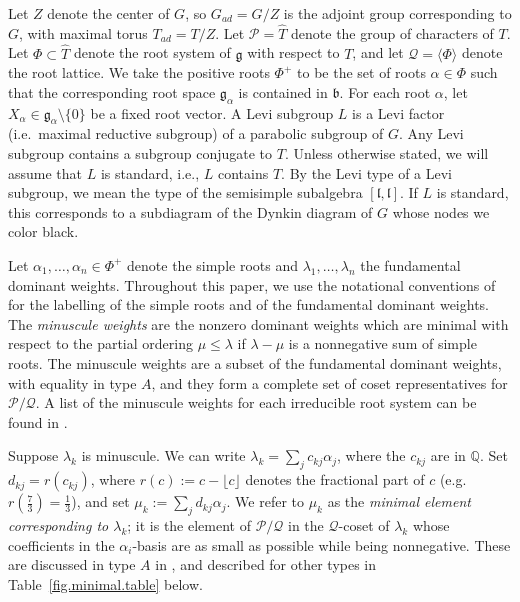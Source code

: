 \documentclass[reqno,11pt]{amsart}
\theoremstyle{remark}
\theoremstyle{remark}
\theoremstyle{definition}
\theoremstyle{definition}
\theoremstyle{definition}
\numberwithin{equation}{section}
\newcommand{\QQ}{\mathbb{ Q}}        %
\newcommand{\fb}{{\mathfrak b}}
\newcommand{\fg}{{\mathfrak g}}
\newcommand{\fl}{{\mathfrak l}}
\newcommand{\ga}{\alpha}
\newcommand{\gl}{\lambda}
\newcommand{\cp}{\mathcal{P}}
\newcommand{\cq}{\mathcal{Q}}
\renewcommand{\hat}{\widehat}
\begin{document}
Let $Z$ denote the center of $G$, so $G_{ad} = G/Z$ is the adjoint group corresponding to $G$, with maximal torus $T_{ad} = T/Z$.  Let $\cp = \hat{T}$ denote the group of characters of $T$.  Let $\Phi \subset \hat{T}$ denote the root system of $\fg$ with respect to $T$, and let $\cq = \langle \Phi \rangle$ denote the root lattice.   We take the positive roots $\Phi^+$ to be the set of roots $\ga\in \Phi$ such that the corresponding root space $\fg_{\ga}$ is contained in $\fb$.  For each root $\ga$, let $X_\ga \in \fg_\ga \setminus \{0\}$ be a fixed root vector.   A Levi subgroup $L$ is a Levi factor (i.e.~maximal reductive subgroup) of a parabolic subgroup of $G$.
Any Levi subgroup contains a subgroup conjugate to $T$.   Unless otherwise stated, we will assume that $L$ is standard, i.e., $L$ contains $T$.   By the Levi type of a Levi subgroup, we
mean the type of the semisimple subalgebra $[\fl, \fl]$.  If $L$ is standard, this corresponds to a subdiagram of the Dynkin diagram of $G$ whose nodes we color black.

Let $\ga_1, \ldots, \ga_n\in \Phi^+$ denote the simple roots and $\gl_1, \ldots, \gl_n$ the fundamental dominant weights. Throughout this paper, we use the notational conventions of~\cite{HumphreysLieAlg} for the labelling of the simple roots and of the fundamental dominant weights. The \emph{minuscule weights} are the nonzero dominant weights which are minimal with respect to
the partial ordering $\mu \leq \lambda$ if $\lambda - \mu$ is a nonnegative sum of simple roots.  The minuscule weights are a subset of the fundamental dominant weights, with equality in type $A$, and they form a complete set of coset representatives for $\cp/\cq$.   A list of the minuscule weights for each irreducible root system can be found in  \cite[\S 13.4, Exercise 13]{HumphreysLieAlg}.

Suppose $\gl_k$ is minuscule.   We can write $\gl_k = \sum_j c_{kj} \ga_j$, where the $c_{kj}$ are in $\QQ$.  Set $d_{kj} = r(c_{kj})$, where $r(c) := c - \lfloor c \rfloor$ denotes the fractional part of $c$ (e.g.~ $r(\frac{7}{3}) = \frac{1}{3}$), and set $\mu_k := \sum_j d_{kj} \ga_j$.  We refer to $\mu_k$ as the \emph{minimal element corresponding to $\gl_k$}; it is the element of $\cp/\cq$ in the $\cq$-coset of $\gl_k$ whose coefficients in the $\ga_i$-basis are as small as possible while being nonnegative. These are discussed in type $A$ in \cite{GPR23}, and described for other types in Table~\ref{fig.minimal.table} below.
\end{document}

